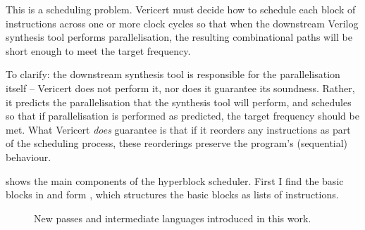 This is a scheduling problem. Vericert must decide how to schedule each block of instructions across one or more clock cycles so that when the downstream Verilog synthesis tool performs parallelisation, the resulting combinational paths will be short enough to meet the target frequency.

To clarify: the downstream synthesis tool is responsible for the parallelisation itself -- Vericert does not perform it, nor does it guarantee its soundness. Rather, it predicts the parallelisation that the synthesis tool will perform, and schedules so that if parallelisation is performed as predicted, the target frequency should be met. What Vericert \emph{does} guarantee is that if it reorders any instructions as part of the scheduling process, these reorderings preserve the program's (sequential) behaviour.

 shows the main components of the hyperblock
scheduler.  First I find the basic blocks in \rtl{} and form \rtlblock{}, which
structures the basic blocks as lists of instructions.

\begin{figure}
\hypersetup{hidelinks}
\centering
{}
  \caption{New passes and intermediate languages introduced in this work.}%
  \label{fig:compcert_interm}
\end{figure}

